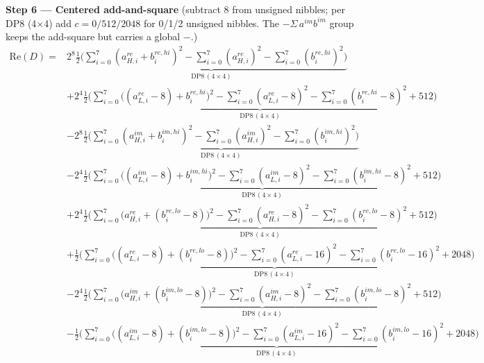 \documentclass[fleqn]{article}
\newcommand{\DPop}[3]{\mathrm{DP#1}\,(#2\!\times\!#3)}
\begin{document}
\textbf{Step 6 --- Centered add-and-square}\quad
{\small(subtract $8$ from unsigned nibbles; per DP8 (4$\times$4) add $c=0/512/2048$ for 0/1/2 unsigned nibbles. The $-\Sigma\,a^{im}b^{im}$ group keeps the add-square but carries a global $-$.)}
\begin{align*}
\mathrm{Re}(D) = {}
  & 2^{8}\underbrace{\tfrac12\Big(\sum_{i=0}^{7}(a_{H,i}^{re}{+}b_i^{re,hi})^2 - \sum_{i=0}^{7}(a_{H,i}^{re})^2 - \sum_{i=0}^{7}(b_i^{re,hi})^2\Big)}_{\DPop{8}{4}{4}} \\[0.4em]
  & + 2^{4}\underbrace{\tfrac12\Big(\sum_{i=0}^{7}\big((a_{L,i}^{re}{-}8){+}b_i^{re,hi}\big)^2 - \sum_{i=0}^{7}(a_{L,i}^{re}{-}8)^2 - \sum_{i=0}^{7}(b_i^{re,hi}{-}8)^2 + 512\Big)}_{\DPop{8}{4}{4}} \\[0.4em]
  & - 2^{8}\underbrace{\tfrac12\Big(\sum_{i=0}^{7}(a_{H,i}^{im}{+}b_i^{im,hi})^2 - \sum_{i=0}^{7}(a_{H,i}^{im})^2 - \sum_{i=0}^{7}(b_i^{im,hi})^2\Big)}_{\DPop{8}{4}{4}} \\[0.4em]
  & - 2^{4}\underbrace{\tfrac12\Big(\sum_{i=0}^{7}\big((a_{L,i}^{im}{-}8){+}b_i^{im,hi}\big)^2 - \sum_{i=0}^{7}(a_{L,i}^{im}{-}8)^2 - \sum_{i=0}^{7}(b_i^{im,hi}{-}8)^2 + 512\Big)}_{\DPop{8}{4}{4}} \\[0.4em]
  & + 2^{4}\underbrace{\tfrac12\Big(\sum_{i=0}^{7}\big(a_{H,i}^{re}{+}(b_i^{re,lo}{-}8)\big)^2 - \sum_{i=0}^{7}(a_{H,i}^{re}{-}8)^2 - \sum_{i=0}^{7}(b_i^{re,lo}{-}8)^2 + 512\Big)}_{\DPop{8}{4}{4}} \\[0.4em]
  & + \underbrace{\tfrac12\Big(\sum_{i=0}^{7}\big((a_{L,i}^{re}{-}8){+}(b_i^{re,lo}{-}8)\big)^2 - \sum_{i=0}^{7}(a_{L,i}^{re}{-}16)^2 - \sum_{i=0}^{7}(b_i^{re,lo}{-}16)^2 + 2048\Big)}_{\DPop{8}{4}{4}} \\[0.4em]
  & - 2^{4}\underbrace{\tfrac12\Big(\sum_{i=0}^{7}\big(a_{H,i}^{im}{+}(b_i^{im,lo}{-}8)\big)^2 - \sum_{i=0}^{7}(a_{H,i}^{im}{-}8)^2 - \sum_{i=0}^{7}(b_i^{im,lo}{-}8)^2 + 512\Big)}_{\DPop{8}{4}{4}} \\[0.4em]
  & - \underbrace{\tfrac12\Big(\sum_{i=0}^{7}\big((a_{L,i}^{im}{-}8){+}(b_i^{im,lo}{-}8)\big)^2 - \sum_{i=0}^{7}(a_{L,i}^{im}{-}16)^2 - \sum_{i=0}^{7}(b_i^{im,lo}{-}16)^2 + 2048\Big)}_{\DPop{8}{4}{4}}
\end{align*}
\end{document}
